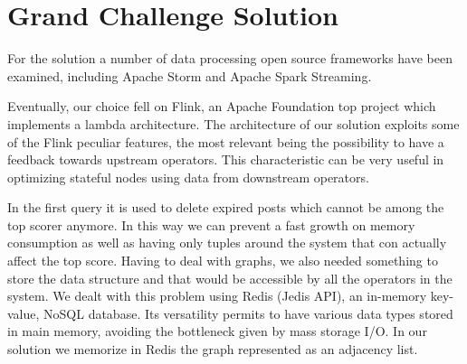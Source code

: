 \section{Grand Challenge Solution}
\label{sec:grand-challenge-solution}

For the solution a number of data processing open source frameworks have been examined, including Apache Storm and Apache Spark Streaming.

Eventually, our choice fell on Flink, an Apache Foundation top project which implements a lambda architecture. The architecture of our solution exploits some of the Flink peculiar features, the most relevant being the possibility to have a feedback towards upstream operators. This characteristic can be very useful in optimizing stateful nodes using data from downstream operators. 

In the first query it is used to delete expired posts which cannot be among the top scorer anymore. In this way we can prevent a fast growth on memory consumption as well as having only tuples around the system that con actually affect the top score. Having to deal with graphs, we also needed something to store the data structure and that would be accessible by all the operators in the system. We dealt with this problem using Redis (Jedis API), an in-memory key-value, NoSQL database. Its versatility permits to have various data types stored in main memory, avoiding the bottleneck given by mass storage I/O. In our solution we memorize in Redis the graph represented as an adjacency list.